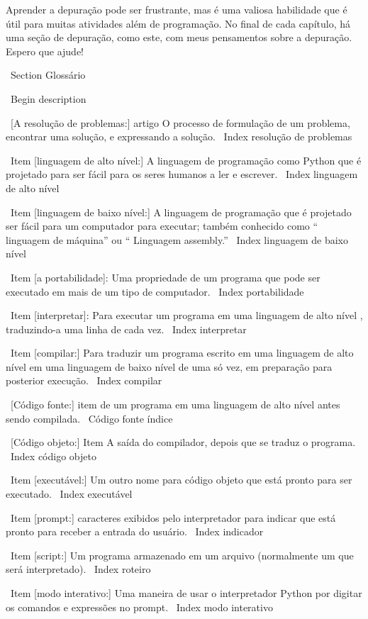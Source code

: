 \documentclass[10pt]{book}
\begin{document}
\begin {itemize}
{Aprender a depuração pode ser frustrante, mas é uma valiosa habilidade
que é útil para muitas atividades além de programação. No
final de cada capítulo, há uma seção de depuração, como este,
com meus pensamentos sobre a depuração. Espero que ajude!


\ Section {} Glossário

\ Begin {description}

\ [A resolução de problemas:] artigo O processo de formulação de um problema, encontrar
uma solução, e expressando a solução.
\ Index {} resolução de problemas

\ Item [linguagem de alto nível:] A linguagem de programação como Python que
é projetado para ser fácil para os seres humanos a ler e escrever.
\ Index {linguagem de alto nível}

\ Item [linguagem de baixo nível:] A linguagem de programação que é projetado
ser fácil para um computador para executar; também conhecido como `` linguagem de máquina'' ou
`` Linguagem assembly.''
\ Index {linguagem de baixo nível}

\ Item [a portabilidade]: Uma propriedade de um programa que pode ser executado em mais
de um tipo de computador.
\ Index {} portabilidade

\ Item [interpretar]: Para executar um programa em uma linguagem de alto nível
, traduzindo-a uma linha de cada vez.
\ Index {interpretar}

\ Item [compilar:] Para traduzir um programa escrito em uma linguagem de alto nível
em uma linguagem de baixo nível de uma só vez, em preparação para posterior
execução.
\ Index {} compilar

\ [Código fonte:] item de um programa em uma linguagem de alto nível antes
sendo compilada.
\ {Código fonte} índice

\ [Código objeto:] Item A saída do compilador, depois que se traduz
o programa.
\ Index {código objeto}

\ Item [executável:] Um outro nome para código objeto que está pronto
para ser executado.
\ Index {executável}

\ Item [prompt:] caracteres exibidos pelo interpretador para indicar
que está pronto para receber a entrada do usuário.
\ Index {indicador}

\ Item [script:] Um programa armazenado em um arquivo (normalmente um que será
interpretado).
\ Index {} roteiro

\ Item [modo interativo:] Uma maneira de usar o interpretador Python por
digitar os comandos e expressões no prompt.
\ Index {modo interativo}

}
\end{itemize}
\end{document}
